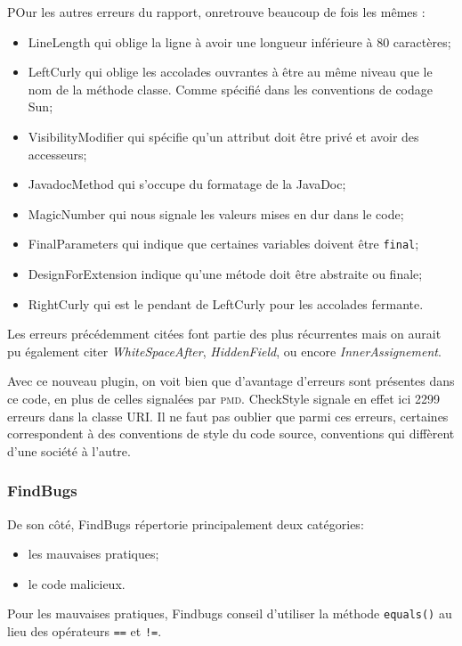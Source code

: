 			POur les autres erreurs du rapport, onretrouve beaucoup de fois les mêmes :
			\begin{itemize}
				\item LineLength qui oblige la ligne à avoir une longueur inférieure à 80 caractères;
				\item LeftCurly qui oblige les accolades ouvrantes à être au même niveau que le nom de la méthode classe. Comme spécifié dans les conventions de codage Sun;
				\item VisibilityModifier qui spécifie qu'un attribut doit être privé et avoir des accesseurs;
				\item JavadocMethod qui s'occupe du formatage de la JavaDoc;
				\item MagicNumber qui nous signale les valeurs mises en dur dans le code;
				\item FinalParameters qui indique que certaines variables doivent être \verb+final+;
				\item DesignForExtension indique qu'une métode doit être abstraite ou finale;
				\item RightCurly qui est le pendant de LeftCurly pour les accolades fermante.
			\end{itemize}

			Les erreurs précédemment citées font partie des plus récurrentes mais on aurait pu également citer \emph{WhiteSpaceAfter}, \emph{HiddenField}, ou encore \emph{InnerAssignement}.

			Avec ce nouveau plugin, on voit bien que d'avantage d'erreurs sont présentes dans ce code, en plus de celles signalées par \textsc{pmd}. CheckStyle signale en effet ici 2299 erreurs dans la classe URI. Il ne faut pas oublier que parmi ces erreurs, certaines correspondent à des conventions de style du code source, conventions qui diffèrent d'une société à l'autre.

		\subsubsection{FindBugs}
			De son côté, FindBugs répertorie principalement deux catégories:
			\begin{itemize}
				\item les mauvaises pratiques;
				\item le code malicieux.
			\end{itemize}

			Pour les mauvaises pratiques, Findbugs conseil d'utiliser la méthode \verb+equals()+ au lieu des opérateurs \verb+==+ et \verb+!=+.

